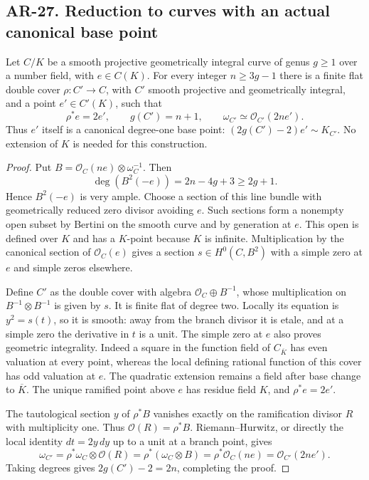\subsection*{AR-27. Reduction to curves with an actual canonical base point}

\begin{lemma}[AR-27a]
Let $C/K$ be a smooth projective geometrically integral curve of genus
$g\ge1$ over a number field, with $e\in C(K)$.  For every integer
$n\ge3g-1$ there is a finite flat double cover
$\rho:C'\to C$, with $C'$ smooth projective and geometrically
integral, and a point $e'\in C'(K)$, such that
\[
 \rho^*e=2e',\qquad g(C')=n+1,\qquad
 \omega_{C'}\simeq\mathcal O_{C'}(2ne').                 \tag{AR.27a}
\]
Thus $e'$ itself is a canonical degree-one base point:
$(2g(C')-2)e'\sim K_{C'}$.  No extension of $K$ is needed for
this construction.
\end{lemma}

\begin{proof}
Put $B=\mathcal O_C(ne)\otimes\omega_C^{-1}$.  Then
\[
 \deg(B^2(-e))=2n-4g+3\ge2g+1.
\]
Hence $B^2(-e)$ is very ample.  Choose a section of this line
bundle with geometrically reduced zero divisor avoiding $e$.
Such sections form a nonempty open subset by Bertini on the smooth
curve and by generation at $e$.  This open is defined over $K$
and has a $K$-point because $K$ is infinite.  Multiplication by
the canonical section of $\mathcal O_C(e)$ gives a section
$s\in H^0(C,B^2)$ with a simple zero at $e$ and simple zeros
elsewhere.

Define $C'$ as the double cover with algebra
$\mathcal O_C\oplus B^{-1}$, whose multiplication on
$B^{-1}\otimes B^{-1}$ is given by $s$.  It is finite flat of
degree two.  Locally its equation is $y^2=s(t)$, so it is smooth:
away from the branch divisor it is etale, and at a simple zero the
derivative in $t$ is a unit.  The simple zero at $e$ also proves
geometric integrality.  Indeed a square in the function field of
$C_{\overline K}$ has even valuation at every point, whereas the
local defining rational function of this cover has odd valuation
at $e$.  The quadratic extension remains a field after base change
to $\overline K$.  The unique ramified point above $e$ has residue
field $K$, and $\rho^*e=2e'$.

The tautological section $y$ of $\rho^*B$ vanishes exactly on the
ramification divisor $R$ with multiplicity one.  Thus
$\mathcal O(R)=\rho^*B$.  Riemann--Hurwitz, or directly the local
identity $dt=2y\,dy$ up to a unit at a branch point, gives
\[
 \omega_{C'}=\rho^*\omega_C\otimes\mathcal O(R)
            =\rho^*(\omega_C\otimes B)
            =\rho^*\mathcal O_C(ne)
            =\mathcal O_{C'}(2ne').
\]
Taking degrees gives $2g(C')-2=2n$, completing the proof.
\end{proof}

